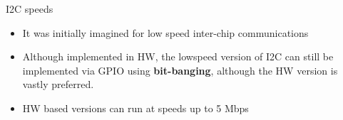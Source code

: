 \begin{frame}
   {I2C speeds}
   \begin{itemize}
      \item It was initially imagined for low speed inter-chip communications
      \item Although implemented in HW, the lowspeed version of I2C can still
            be implemented via GPIO using \textbf{bit-banging},
            although the HW version is vastly preferred.
      \item HW based versions can run at speeds up to 5 Mbps
   \end{itemize}
\end{frame}

\cprotect\note{

}

